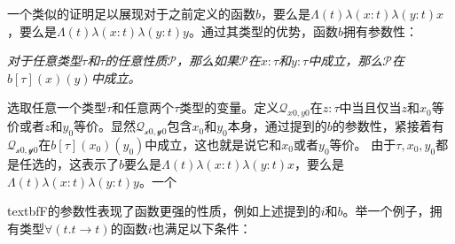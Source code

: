 一个类似的证明足以展现对于之前定义的函数$b$，要么是$\Lambda (t) \lambda (x:t) \lambda (y:t) x$，要么是$\Lambda (t) \lambda (x:t) \lambda (y:t) y$。通过其类型的优势，函数$b$拥有参数性：
\begin{center}
  \textit{对于任意类型$\tau$和$\tau$的任意性质$\mathcal{P}$，那么如果$\mathcal{P}$在$x:\tau$和$y:\tau$中成立，那么$\mathcal{P}$在$b[\tau](x)(y)$中成立。}
\end{center}

选取任意一个类型$\tau$和任意两个$\tau$类型的变量。定义$\mathcal{Q}_{x0,y0}$在$z:\tau$中当且仅当$z$和$x_0$等价或者$z$和$y_0$等价。显然$\mathcal{Q_{x0,y0}}$包含$x_0$和$y_0$本身，通过提到的$b$的参数性，紧接着有$\mathcal{Q_{x0,y0}}$在$b[\tau](x_0)(y_0)$中成立，这也就是说它和$x_0$或者$y_0$等价。
由于$\tau, x_0, y_0$都是任选的，这表示了$b$要么是$\Lambda (t) \lambda (x:t) \lambda (y:t) x$，要么是$\Lambda (t) \lambda (x:t) \lambda (y:t) y$。一个

textbf{F}的参数性表现了函数更强的性质，例如上述提到的$i$和$b$。举一个例子，拥有类型$\forall (t.t \to t)$的函数$i$也满足以下条件：
\begin{center}
\end{center}